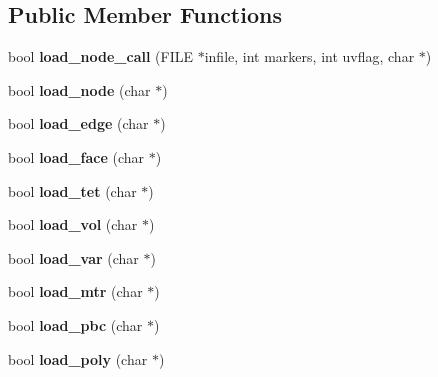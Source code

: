 \subsection*{Public Member Functions}
\begin{DoxyCompactItemize}
\item 
\mbox{\label{classtetgenio_a72c82390f2cf5cc8e82b7e78d3957d97}} 
bool {\bfseries load\+\_\+node\+\_\+call} (F\+I\+LE $\ast$infile, int markers, int uvflag, char $\ast$)
\item 
\mbox{\label{classtetgenio_afeb93fe605c74f7523314fe21b726872}} 
bool {\bfseries load\+\_\+node} (char $\ast$)
\item 
\mbox{\label{classtetgenio_ae57d905901345797047108bc8995382a}} 
bool {\bfseries load\+\_\+edge} (char $\ast$)
\item 
\mbox{\label{classtetgenio_acfd5a05583426d2d50c554e353814b22}} 
bool {\bfseries load\+\_\+face} (char $\ast$)
\item 
\mbox{\label{classtetgenio_afcb7616b65ca87657affbdad0c9dbe0b}} 
bool {\bfseries load\+\_\+tet} (char $\ast$)
\item 
\mbox{\label{classtetgenio_ad2c1a5e053689f1e68c0c849d3ebcd3d}} 
bool {\bfseries load\+\_\+vol} (char $\ast$)
\item 
\mbox{\label{classtetgenio_a42b38e1e09d889f3027225402d888721}} 
bool {\bfseries load\+\_\+var} (char $\ast$)
\item 
\mbox{\label{classtetgenio_a281d6699f746ac5d2b4ca70075be53c7}} 
bool {\bfseries load\+\_\+mtr} (char $\ast$)
\item 
\mbox{\label{classtetgenio_a9c3559e0c61df8bb9d4ccff74af39cc0}} 
bool {\bfseries load\+\_\+pbc} (char $\ast$)
\item 
\mbox{\label{classtetgenio_a88658f64d725eb11ff33e7104e14561b}} 
bool {\bfseries load\+\_\+poly} (char $\ast$)
\item 
\mbox{\label{classtetgenio_a71c8e637cb420c3a87b648405df47abd}} 

\end{DoxyCompactItemize}
